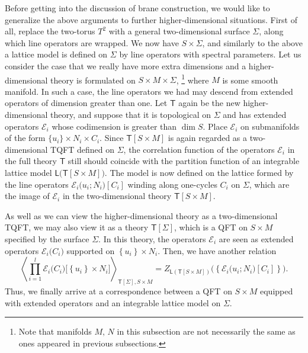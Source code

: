 Before getting into the discussion of brane construction, we would like
to generalize the above arguments to further higher-dimensional situations.
First of all, replace the two-torus $T^{2}$ with a general two-dimensional
surface $\Sigma$, along which line operators are wrapped. We now
have $S\times\Sigma$, and similarly to the above a lattice model
is defined on $\Sigma$ by line operators with spectral parameters.
Let us consider the case that we really have more extra dimensions
and a higher-dimensional theory is formulated on $S\times M\times\Sigma$,%
\footnote{Note that manifolds $M,\, N$ in this subsection are not necessarily the same as ones appeared in
previous subsections.}
%
where $M$ is some smooth manifold. In such a case, the line operators we had may
descend from extended operators of dimension greater than one. Let
$\mathsf{T}$ again be the new higher-dimensional theory, and suppose
that it is topological on $\Sigma$ and has extended operators $\mathcal{E}_{i}$
whose codimension is greater than $\dim S$. Place $\mathcal{E}_{i}$
on submanifolds of the form $\{ u_{i}\} \times N_{i}\times C_{i}$.
Since $\mathsf{T}[S\times M]$ is again regarded as a two-dimensional
TQFT defined on $\Sigma$, the correlation function of the operators
$\mathcal{E}_{i}$ in the full theory $\mathsf{T}$ still should coincide with the partition function
of an integrable lattice model $\mathsf{L}\big(\mathsf{T}[S\times M]\big)$.
The model is now defined on the lattice formed by the line operators
$\mathcal{E}_{i}\big(u_{i}; N_{i}\big)[C_i]$ winding along one-cycles $C_i$ on $\Sigma$,
which are the image of $\mathcal{E}_{i}$ in the two-dimensional theory
$\mathsf{T}[S\times M]$.

As well as we can view the higher-dimensional theory as a two-dimensional
TQFT, we may also view it as a theory $\mathsf{T}[\Sigma]$,
which is a QFT on $S\times M$ specified by the surface $\Sigma$.
In this theory, the operators $\mathcal{E}_{i}$ are seen as extended
operators $\mathcal{E}_{i}\big(C_{i}\big)$ supported on $\left\{ u_{i}\right\} \times N_{i}$.
Then, we have another relation
\begin{equation}
  \left\langle
    \prod_{i=1}^{l} \mathcal{E}_{i}\big(C_{i}\big)
    \big[\left\{ u_{i}\right\} \times N_{i}\big]
      \right\rangle_{\mathsf{T}\left[\Sigma\right],S\times M}
    =
      Z_{\mathsf{L}(\mathsf{T}[S\times M])}
        \big(\left\{ \mathcal{E}_{i}\big(u_{i}; N_{i}\big)[C_i]\right\})
    .
  \label{eq:correspondence_0}
\end{equation}
Thus, we finally arrive at a correspondence between a QFT on $S\times M$
equipped with extended operators and an integrable lattice model on
$\Sigma$.







